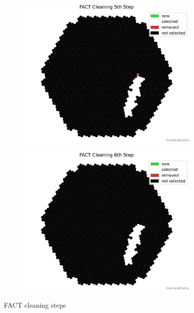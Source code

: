 \begin{figure}
\begin{subfigure}[b]{0.32\textwidth}
        \includegraphics[width=\textwidth]{plots/cleaner_steps/fact_5.pdf}
    \end{subfigure}
    \hfill
    \begin{subfigure}[b]{0.32\textwidth}
        \includegraphics[width=\textwidth]{plots/cleaner_steps/fact_6.pdf}
    \end{subfigure}
    \caption{FACT cleaning steps}
    \label{fig:fact_cleaning}
\end{figure}

